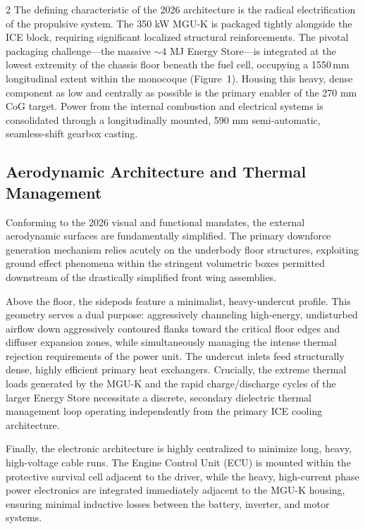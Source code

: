 \begin{multicols}{2}
The defining characteristic of the 2026 architecture is the radical electrification of the propulsive system. The 350 kW MGU-K is packaged tightly alongside the ICE block, requiring significant localized structural reinforcements. The pivotal packaging challenge---the massive $\sim$4 MJ Energy Store---is integrated at the lowest extremity of the chassis floor beneath the fuel cell, occupying a 1550\,mm longitudinal extent within the monocoque (Figure~1). Housing this heavy, dense component as low and centrally as possible is the primary enabler of the 270 mm CoG target. Power from the internal combustion and electrical systems is consolidated through a longitudinally mounted, 590 mm semi-automatic, seamless-shift gearbox casting.

\subsection{Aerodynamic Architecture and Thermal Management}

Conforming to the 2026 visual and functional mandates, the external aerodynamic surfaces are fundamentally simplified. The primary downforce generation mechanism relies acutely on the underbody floor structures, exploiting ground effect phenomena within the stringent volumetric boxes permitted downstream of the drastically simplified front wing assemblies. 

Above the floor, the sidepods feature a minimalist, heavy-undercut profile. This geometry serves a dual purpose: aggressively channeling high-energy, undisturbed airflow down aggressively contoured flanks toward the critical floor edges and diffuser expansion zones, while simultaneously managing the intense thermal rejection requirements of the power unit. The undercut inlets feed structurally dense, highly efficient primary heat exchangers. Crucially, the extreme thermal loads generated by the MGU-K and the rapid charge/discharge cycles of the larger Energy Store necessitate a discrete, secondary dielectric thermal management loop operating independently from the primary ICE cooling architecture. 

Finally, the electronic architecture is highly centralized to minimize long, heavy, high-voltage cable runs. The Engine Control Unit (ECU) is mounted within the protective survival cell adjacent to the driver, while the heavy, high-current phase power electronics are integrated immediately adjacent to the MGU-K housing, ensuring minimal inductive losses between the battery, inverter, and motor systems.
\end{multicols}

